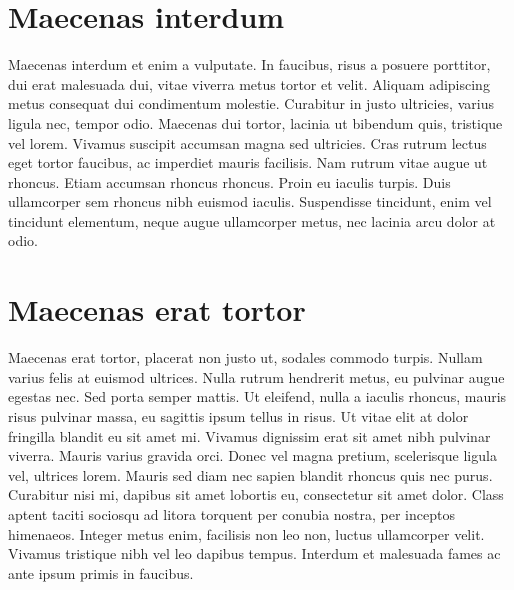 \documentclass[a4paper,12pt,notitlepage,twoside]{article}
\begin{document}
  \section{Maecenas interdum}
  
  Maecenas interdum et enim a vulputate. In faucibus, risus a posuere porttitor, dui erat malesuada dui, vitae viverra metus tortor et velit. Aliquam adipiscing metus consequat dui condimentum molestie. Curabitur in justo ultricies, varius ligula nec, tempor odio. Maecenas dui tortor, lacinia ut bibendum quis, tristique vel lorem. Vivamus suscipit accumsan magna sed ultricies. Cras rutrum lectus eget tortor faucibus, ac imperdiet mauris facilisis. Nam rutrum vitae augue ut rhoncus. Etiam accumsan rhoncus rhoncus. Proin eu iaculis turpis. Duis ullamcorper sem rhoncus nibh euismod iaculis. Suspendisse tincidunt, enim vel tincidunt elementum, neque augue ullamcorper metus, nec lacinia arcu dolor at odio.
  
  \section{Maecenas erat tortor}
  
  Maecenas erat tortor, placerat non justo ut, sodales commodo turpis. Nullam varius felis at euismod ultrices. Nulla rutrum hendrerit metus, eu pulvinar augue egestas nec. Sed porta semper mattis. Ut eleifend, nulla a iaculis rhoncus, mauris risus pulvinar massa, eu sagittis ipsum tellus in risus. Ut vitae elit at dolor fringilla blandit eu sit amet mi. Vivamus dignissim erat sit amet nibh pulvinar viverra. Mauris varius gravida orci. Donec vel magna pretium, scelerisque ligula vel, ultrices lorem. Mauris sed diam nec sapien blandit rhoncus quis nec purus. Curabitur nisi mi, dapibus sit amet lobortis eu, consectetur sit amet dolor. Class aptent taciti sociosqu ad litora torquent per conubia nostra, per inceptos himenaeos. Integer metus enim, facilisis non leo non, luctus ullamcorper velit. Vivamus tristique nibh vel leo dapibus tempus. Interdum et malesuada fames ac ante ipsum primis in faucibus. 
  
\end{document}

